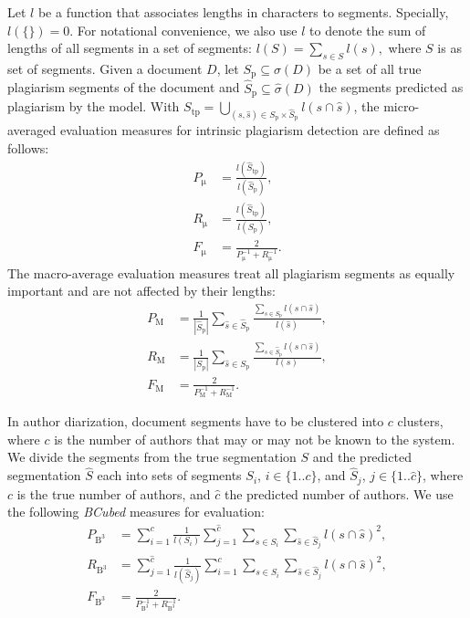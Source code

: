 \documentclass[10pt, a4paper]{article}
\begin{document}
Let $l$ be a function that associates lengths in characters to segments. Specially, $l(\{\}) = 0$. For notational convenience, we also use $l$ to denote the sum of lengths of all segments in a set of segments: $l(S) = \sum_{s\in S} l(s),$ where $S$ is as set of segments. Given a document $D$, let $S_\mathrm{p} \subseteq \sigma(D)$ be a set of all true plagiarism segments of the document and $\hat{S}_\mathrm{p} \subseteq \hat{\sigma}(D)$ the segments predicted as plagiarism by the  model. With ${S_\mathrm{tp} = \bigcup_{(s,\hat{s})\in S_\mathrm{p}\times\hat{S}_\mathrm{p}} l(s\cap\hat{s})}$, the micro-averaged evaluation measures for intrinsic plagiarism detection are defined as follows:
\begin{align}
P_\mathrm{\mu} &= \frac{l(\hat{S}_\mathrm{tp})}{l(\hat{S}_\mathrm{p})}, \\
R_\mathrm{\mu} &= \frac{l(\hat{S}_\mathrm{tp})}{l(S_\mathrm{p})}, \\
F_\mathrm{\mu} &= \frac{2}{P_\mathrm{\mu}^{-1}+R_\mathrm{\mu}^{-1}}.
\end{align}
The macro-average evaluation measures treat all plagiarism segments as equally important and are not affected by their lengths:
\begin{align}
P_\mathrm{M} &= \frac{1}{|\hat{S}_\mathrm{p}|}
	\sum_{\hat{s}\in\hat{S}_\mathrm{p}}
		\frac{{\sum_{s\in S_\mathrm{p}} l(s\cap\hat{s})}}{l(\hat{s})}, \\
R_\mathrm{M} &= \frac{1}{|S_\mathrm{p}|}
	\sum_{\hat{s}\in S_\mathrm{p}}
		\frac{{\sum_{s\in \hat{S}_\mathrm{p}} l(s\cap\hat{s})}}{l(s)}, \\
F_\mathrm{M} &= \frac{2}{P_\mathrm{M}^{-1}+R_\mathrm{M}^{-1}}.
\end{align}

In author diarization, document segments have to be clustered into $c$ clusters, where $c$ is the number of authors that may or may not be known to the system. We divide the segments from the true segmentation $S$ and the predicted segmentation $\hat{S}$ each into sets of segments $S_i$, $i\in\{1..c\}$, and $\hat{S}_j$, $j\in\{1..\hat{c}\}$, where $c$ is the true number of authors, and $\hat{c}$ the predicted number of authors. We use the following \emph{BCubed} measures for evaluation:
\begin{align}
P_{\mathrm{B}^3} &= \sum_{i=1}^c \frac{1}{l(S_i)}\sum_{j=1}^{\hat{c}}
	\sum_{s\in S_i}	\sum_{\hat{s}\in\hat{S}_j} l(s\cap \hat{s})^2, \\
R_{\mathrm{B}^3} &= \sum_{j=1}^{\hat{c}} \frac{1}{l(\hat{S}_j)}\sum_{i=1}^{c}
	\sum_{s\in S_i}	\sum_{\hat{s}\in\hat{S}_j} l(s\cap \hat{s})^2, \\
F_{\mathrm{B}^3} &= \frac{2}{P_{\mathrm{B}^3}^{-1}+R_{\mathrm{B}^3}^{-1}}.
\end{align}
\end{document}

